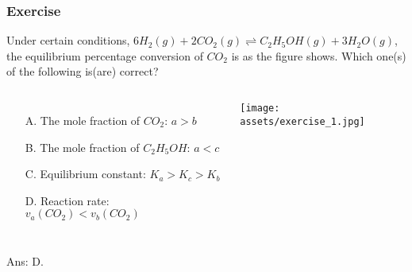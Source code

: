 \documentclass[aspectratio=169]{beamer}
\begin{document}
\begin{frame}
  \frametitle{Exercise}
  Under certain conditions, $6H_2(g) + 2CO_2(g) \rightleftharpoons C_2 H_5 OH(g) + 3H_2O(g)$, the equilibrium 
  percentage conversion of $CO_2$ is as the figure shows. Which one(s) of the following is(are) correct?
  \begin{columns}
    \begin{itemize}
      \item[A.] The mole fraction of $CO_2$: $a > b$
      \item[B.] The mole fraction of $C_2H_5OH$: $a < c$
      \item[C.] Equilibrium constant: $K_a > K_c > K_b$
      \item[D.] Reaction rate: $v_a(CO_2) < v_b(CO_2)$  
    \end{itemize}
    \texttt{[image: assets/exercise\_1.jpg]}
  \end{columns}
  \pause
  Ans: D.
\end{frame}
\end{document}
